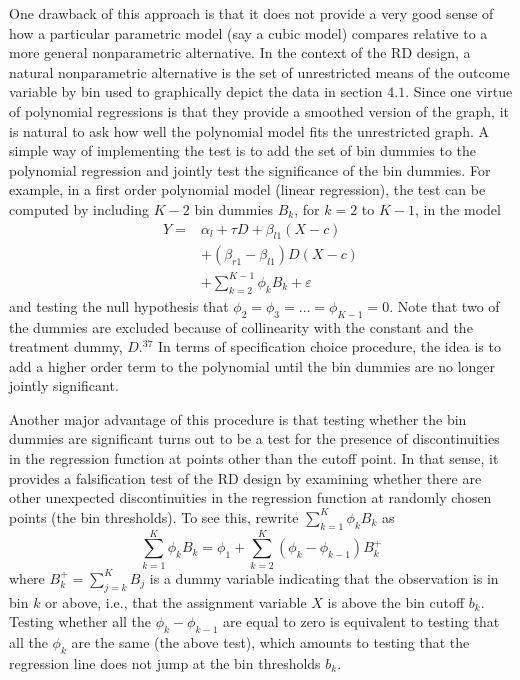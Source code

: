 \documentclass[11pt]{book}%
\begin{document}
 One drawback of this approach is that it does not provide a very good sense of how  a particular parametric model (say a cubic model) compares relative to a more general nonparametric alternative. In the context of the RD design, a natural nonparametric alternative is the set of unrestricted means of the outcome variable by bin used to graphically depict the data in section $4.1$. Since one virtue of polynomial regressions is that they provide a smoothed version of the graph, it is natural to ask how well the polynomial model fits the unrestricted graph. A simple way of implementing the test is to add the set of bin dummies to the polynomial regression and jointly test the significance of the bin dummies. For example, in a first order polynomial model (linear regression), the test can be computed by including $K-2$ bin dummies $B_{k}$, for $k=2$ to $K-1$, in the model
 $$
 \begin{aligned}
 Y=& \alpha_{l}+\tau D+\beta_{l 1}(X-c) \\
 &+\left(\beta_{r 1}-\beta_{l 1}\right) D(X-c) \\
 &+\sum_{k=2}^{K-1} \phi_{k} B_{k}+\varepsilon
 \end{aligned}
 $$
 and testing the null hypothesis that $\phi_{2}=\phi_{3}=\ldots=\phi_{K-1}=0$. Note that two of
 the dummies are excluded because of collinearity with the constant and the treatment dummy, $D .^{37}$ In terms of specification choice procedure, the idea is to add a higher order term to the polynomial until the bin dummies are no longer jointly significant.
 
 Another major advantage of this procedure is that testing whether the bin dummies are significant turns out to be a test for the presence of discontinuities in the regression function at points other than the cutoff point. In that sense, it provides a falsification test of the RD design by examining whether there are other unexpected discontinuities in the regression function at randomly chosen points (the bin thresholds). To see this, rewrite $\sum_{k=1}^{K} \phi_{k} B_{k}$ as
 $$
 \sum_{k=1}^{K} \phi_{k} B_{k}=\phi_{1}+\sum_{k=2}^{K}\left(\phi_{k}-\phi_{k-1}\right) B_{k}^{+}
 $$
 where $B_{k}^{+}=\sum_{j=k}^{K} B_{j}$ is a dummy variable indicating that the observation is in bin $k$ or above, i.e., that the assignment variable $X$ is above the bin cutoff $b_{k}$. Testing whether all the $\phi_{k}-\phi_{k-1}$ are equal to zero is equivalent to testing that all the $\phi_{k}$ are the same (the above test), which amounts to testing that the regression line does not jump at the bin thresholds $b_{k}$.
 
\end{document}
